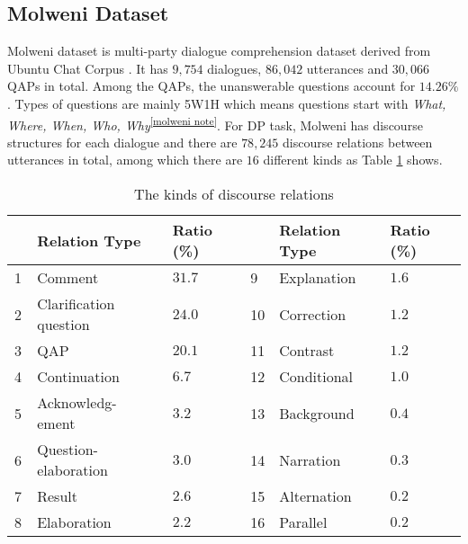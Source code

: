 \documentclass[11pt]{article}
\begin{document}
\subsection{Molweni Dataset}\label{subsec:dataset}
Molweni dataset \cite{li-etal-2020-molweni} is multi-party dialogue comprehension dataset derived from Ubuntu Chat Corpus \cite{li-etal-2020-molweni}. It has $9,754$ dialogues, $86,042$ utterances and $30,066$ QAPs in total. Among the QAPs, the unanswerable questions account for $14.26\%$. Types of questions are mainly 5W1H which means questions start with \textit{What, Where, When, Who, Why}\textsuperscript{\ref{molweni note}}. For DP task, Molweni has discourse structures for each dialogue and there are $78,245$ discourse relations between utterances in total, among which there are $16$ different kinds as Table \ref{tab:relation types} shows.
\begin{table}[ht]
\renewcommand\arraystretch{1} 
\centering
\small
    \begin{tabular}{p{0.3cm}p{1.5cm}p{0.8cm}<{\raggedleft}|p{0.3cm}p{1.5cm}p{0.8cm}<{\raggedleft}}
    \toprule
    ~ & \textbf{Relation Type} & \textbf{Ratio (\%)} & ~ & \textbf{Relation Type} & \textbf{Ratio (\%)}\\ \midrule
    1 & Comment & $31.7$ &9 &  Explanation & $1.6$ \\
    2 & Clarification question & $24.0$ &10 &  Correction & $1.2$ \\
    3 & QAP & $20.1$ & 11 & Contrast & $1.2$ \\
    4 & Continuation & $6.7$ & 12 & Conditional & $1.0$\\
    5 & Acknowledg- ement & $3.2$ & 13 & Background & $0.4$\\
    6 & Question-elaboration & $3.0$ & 14 & Narration & $0.3$\\
    7 & Result & $2.6$ & 15 & Alternation & $0.2$ \\
    8 & Elaboration & $2.2$ & 16 & Parallel & $0.2$ \\
    \bottomrule
    \end{tabular}
\caption{\label{tab:relation types}The kinds of discourse relations}
\end{table}
\end{document}
